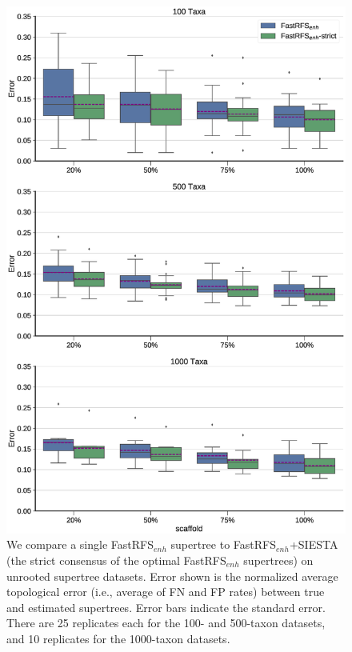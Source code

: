 \begin{figure}[ht]
  \centering
\includegraphics[width=\textwidth, height=0.8\textheight,keepaspectratio]{siesta-figs/fastrfs-enh-siesta-comparison}
\caption[Error rates for FastRFS$_{enh}$ and FastRFS$_{enh}$+SIESTA (strict consensus) on simulated datasets]{We compare a single FastRFS$_{enh}$ supertree to FastRFS$_{enh}$+SIESTA (the strict consensus of the optimal FastRFS$_{enh}$ supertrees) on unrooted supertree datasets.
Error shown is the normalized average topological error (i.e., average of FN and FP rates) between true and estimated supertrees.
Error bars indicate the standard error. 
There are 25 replicates each for the 100- and 500-taxon datasets, and 10 replicates for the 1000-taxon datasets.
   }
     \label{siesta::fig:supertree-error-unrooted}
\end{figure}


